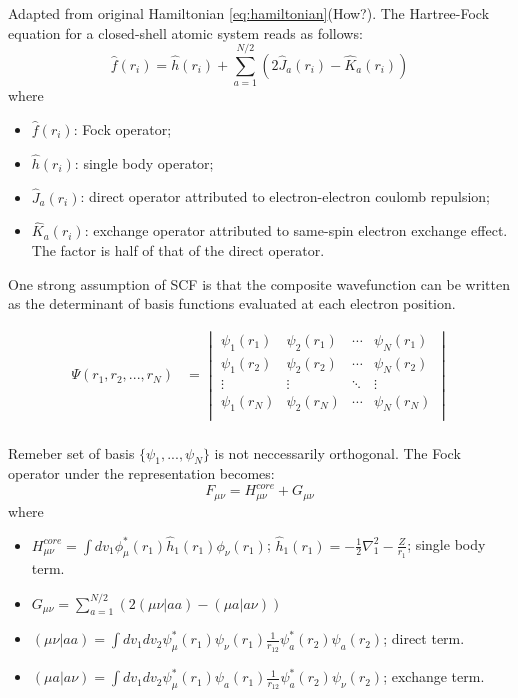 \documentclass[11pt]{article}
\begin{document}
Adapted from original Hamiltonian \ref{eq:hamiltonian}(How?). The Hartree-Fock equation for a closed-shell atomic system reads as follows:
\cite{Fock_matrix_source}
\begin{equation}
\label{eq:hartree-fock}
\hat{f}(r_i) = \hat{h}(r_i)+\sum_{a=1}^{N/2}(2\hat{J}_a(r_i)-\hat{K}_a(r_i))
\end{equation}
where
\begin{itemize}
    \item $\hat{f}(r_i)$: Fock operator;
    \item $\hat{h}(r_i)$: single body operator;
    \item $\hat{J}_a(r_i)$: direct operator attributed to electron-electron coulomb repulsion;
    \item $\hat{K}_a(r_i)$: exchange operator attributed to same-spin electron exchange effect. The factor is half of that of the direct operator. 
\end{itemize}
One strong assumption of SCF is that the composite wavefunction can be written as the determinant of basis functions evaluated at each electron position. 

\begin{align*}
    \Psi(r_1, r_2, ..., r_N) &= 
    \begin{vmatrix}
    \psi_1(r_1) & \psi_2(r_1)  & \cdots & \psi_N(r_1) \\ 
    \psi_1(r_2) & \psi_2(r_2) & \cdots & \psi_N(r_2) \\ 
    \vdots & \vdots& \ddots & \vdots \\
    \psi_1(r_N) & \psi_2(r_N) & \cdots & \psi_N(r_N) \\ 
    \end{vmatrix} \\
\end{align*}

Remeber set of basis $\{\psi_1, ... , \psi_N\}$ is not neccessarily orthogonal. The Fock operator under the representation becomes:
\begin{equation}\label{eq:fock-representation}
    F_{\mu\nu}=H^{core}_{\mu\nu} + G_{\mu\nu}
\end{equation}
where 
\begin{itemize}
    \item $H^{core}_{\mu \nu} = \int{dv_1 \phi_{\mu}^*(r_1)\hat{h}_1(r_1)\phi_{\nu}(r_1)}$; $\hat{h}_1(r_1)=-\frac{1}{2}\nabla^2_1-\frac{Z}{r_1}$; single body term.
    \item $G_{\mu\nu} = \sum_{a=1}^{N/2}(2(\mu\nu|aa)-(\mu a|a\nu))$
    \item $(\mu\nu|aa)=\int{dv_1 dv_2 \psi_{\mu}^*(r_1)\psi_{\nu}(r_1) \frac{1}{r_{12}} \psi_a^*(r_2)\psi_a(r_2)}$; direct term.
    \item $(\mu a|a\nu)=\int{dv_1 dv_2 \psi_{\mu}^*(r_1)\psi_{a}(r_1) \frac{1}{r_{12}} \psi_a^*(r_2)\psi_{\nu}(r_2)}$; exchange term.
\end{itemize}
\end{document}
